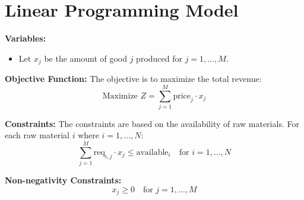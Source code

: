\documentclass{article}
\begin{document}
\section*{Linear Programming Model}

\textbf{Variables:}
\begin{itemize}
    \item Let \( x_j \) be the amount of good \( j \) produced for \( j = 1, \ldots, M \).
\end{itemize}

\textbf{Objective Function:}
The objective is to maximize the total revenue:
\[
\text{Maximize } Z = \sum_{j=1}^{M} \text{price}_j \cdot x_j
\]

\textbf{Constraints:}
The constraints are based on the availability of raw materials. For each raw material \( i \) where \( i = 1, \ldots, N \):
\[
\sum_{j=1}^{M} \text{req}_{i,j} \cdot x_j \leq \text{available}_{i} \quad \text{for } i = 1, \ldots, N
\]

\textbf{Non-negativity Constraints:}
\[
x_j \geq 0 \quad \text{for } j = 1, \ldots, M
\]
\end{document}
